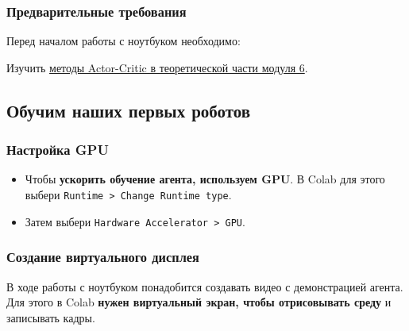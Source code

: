 \documentclass[11pt,a4paper]{article}
\begin{document}
\subsubsection{Предварительные требования}\label{prerequisites}

Перед началом работы с ноутбуком необходимо:

Изучить \href{https://huggingface.co/deep-rl-course/unit6/introduction}{методы Actor-Critic в теоретической части модуля 6}.

\subsection{Обучим наших первых роботов}\label{lets-train-our-first-robots}

\subsubsection{Настройка GPU}\label{set-the-gpu}

\begin{itemize}
\tightlist
\item
  Чтобы \textbf{ускорить обучение агента, используем GPU}. В Colab для этого выбери \texttt{Runtime\ \textgreater{}\ Change\ Runtime\ type}.
\end{itemize}


\begin{itemize}
\tightlist
\item
  Затем выбери \texttt{Hardware\ Accelerator\ \textgreater{}\ GPU}.
\end{itemize}


\subsubsection{Создание виртуального дисплея}\label{create-a-virtual-display}

В ходе работы с ноутбуком понадобится создавать видео с демонстрацией агента. Для этого в Colab \textbf{нужен виртуальный экран, чтобы отрисовывать среду} и записывать кадры.
\end{document}
